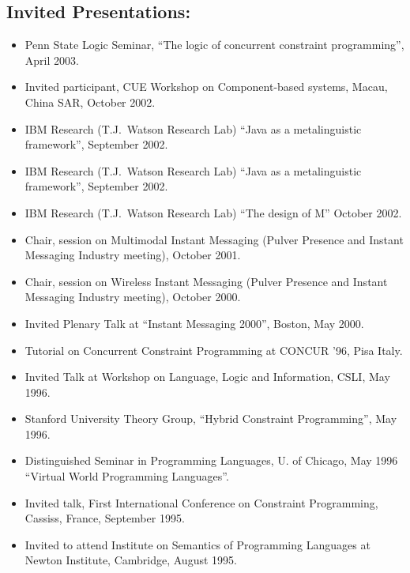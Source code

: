 \documentclass{article}
\begin{document}
\subsection*{Invited Presentations:}
\begin{itemize}
\item 
Penn State Logic Seminar, ``The logic of concurrent constraint
programming'', April 2003.

\item 
Invited participant, CUE Workshop on Component-based systems, Macau,
China SAR, October 2002.

\item IBM Research (T.J.~Watson Research Lab) ``Java as a metalinguistic
framework'', September 2002.
\item 
IBM Research (T.J.~Watson Research Lab) ``Java as a metalinguistic
framework'', September 2002.

\item 
IBM Research (T.J.~Watson Research Lab) ``The design of M''
October 2002.

\item
Chair, session on Multimodal Instant Messaging (Pulver Presence and
Instant Messaging Industry meeting), October 2001.

\item
Chair, session on Wireless Instant Messaging (Pulver Presence and
Instant Messaging Industry meeting), October 2000.

\item Invited Plenary Talk at ``Instant Messaging 2000'', Boston, May
    2000.

\item Tutorial on Concurrent Constraint Programming at CONCUR
    '96, Pisa Italy.

 \item Invited Talk at Workshop on Language, Logic and
    Information, CSLI, May 1996.

 \item Stanford University Theory Group, ``Hybrid Constraint
    Programming'', May 1996. 

 \item Distinguished Seminar in Programming Languages, U. of
    Chicago,  May 1996 ``Virtual World Programming Languages''. 

 \item Invited talk, First International Conference
    on Constraint Programming, Cassiss, France, September 1995. 

 \item Invited to attend Institute on Semantics of Programming
    Languages at Newton Institute, Cambridge, August 1995.  


\end{itemize}
\end{document}
